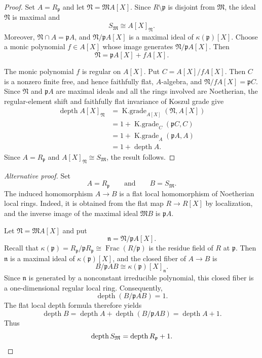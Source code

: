 \documentclass[11pt]{amsart}
\numberwithin{equation}{section}
\theoremstyle{definition}
\theoremstyle{remark}
\newcommand{\depth}{\operatorname{depth}}
\newcommand{\Kgr}{\operatorname{K.grade}}
\begin{document}
\begin{proof}
Set $A=R_{\mathfrak p}$ and let
$\mathfrak N=\mathfrak M A[X]$.  Since
$R\setminus\mathfrak p$ is disjoint from $\mathfrak M$, the ideal
$\mathfrak N$ is maximal and
\[
 S_{\mathfrak M}\cong A[X]_{\mathfrak N}.
\]
Moreover, $\mathfrak N\cap A=\mathfrak pA$, and
$\mathfrak N/\mathfrak pA[X]$ is a maximal ideal of
$\kappa(\mathfrak p)[X]$.  Choose a monic polynomial
$f\in A[X]$ whose image generates
$\mathfrak N/\mathfrak pA[X]$.  Then
\[
 \mathfrak N=\mathfrak pA[X]+fA[X].
\]

The monic polynomial $f$ is regular on $A[X]$.  Put
$C=A[X]/fA[X]$.  Then $C$ is a nonzero finite free, and hence
faithfully flat, $A$-algebra, and
$\mathfrak N/fA[X]=\mathfrak pC$.  Since $\mathfrak N$ and
$\mathfrak pA$ are maximal ideals and all the rings involved are
Noetherian, the regular-element shift and faithfully flat invariance
of Koszul grade give
\[
 \begin{aligned}
 \depth A[X]_{\mathfrak N}
 &=\Kgr_{A[X]}(\mathfrak N,A[X])\\
 &=1+\Kgr_C(\mathfrak pC,C)\\
 &=1+\Kgr_A(\mathfrak pA,A)\\
 &=1+\depth A.
 \end{aligned}
\]
Since $A=R_{\mathfrak p}$ and
$A[X]_{\mathfrak N}\cong S_{\mathfrak M}$, the result follows.
\end{proof}

\begin{proof}[Alternative proof]
Set
\[
 A=R_{\mathfrak p}
 \qquad\text{and}\qquad
 B=S_{\mathfrak M}.
\]
The induced homomorphism $A\to B$ is a flat local homomorphism of
Noetherian local rings.  Indeed, it is obtained from the flat map
$R\to R[X]$ by localization, and the inverse image of the maximal
ideal $\mathfrak M B$ is $\mathfrak pA$.

Let $\mathfrak N=\mathfrak M A[X]$ and put
\[
 \mathfrak n=\mathfrak N/\mathfrak pA[X].
\]
Recall that
$\kappa(\mathfrak p)=R_{\mathfrak p}/\mathfrak pR_{\mathfrak p}
\cong\operatorname{Frac}(R/\mathfrak p)$
is the residue field of $R$ at $\mathfrak p$.
Then $\mathfrak n$ is a maximal ideal of
$\kappa(\mathfrak p)[X]$, and the closed fiber of $A\to B$ is
\[
 B/\mathfrak pAB
 \cong
 \kappa(\mathfrak p)[X]_{\mathfrak n}.
\]
Since $\mathfrak n$ is generated by a nonconstant irreducible
polynomial, this closed fiber is a one-dimensional regular local
ring.  Consequently,
\[
 \depth(B/\mathfrak pAB)=1.
\]
The flat local depth formula
\cite[Lemma~10.163.2, Tag~0337]{Stacks}
therefore yields
\[
 \depth B
 =\depth A+\depth(B/\mathfrak pAB)
 =\depth A+1.
\]
Thus
\[
 \depth S_{\mathfrak M}
 =\depth R_{\mathfrak p}+1.  \qedhere
\]
\end{proof}
\end{document}
